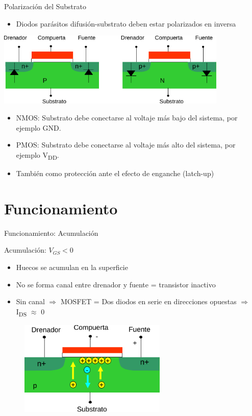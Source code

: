 \documentclass[t,aspectratio=169,10pt]{beamer}
\begin{document}
\begin{frame}{Polarización del Substrato}
\begin{itemize}
	\item Diodos parásitos difusión-substrato deben estar polarizados en inversa
\end{itemize}

\vspace{3mm}
\centering
\includegraphics[width=11cm]{polsub}

\vspace{3mm}
\begin{itemize}
	\item NMOS: Substrato debe conectarse al voltaje más bajo del sistema, por ejemplo GND.
	\item PMOS: Substrato debe conectarse al voltaje más alto del sistema, por ejemplo V\textsubscript{DD}.
	\item También como protección ante el efecto de enganche (latch-up)
\end{itemize}
\end{frame}



\section{Funcionamiento}
\begin{frame}{Funcionamiento: Acumulación}

Acumulación: \hspace{5mm} $V_{GS} < 0$

\begin{itemize}
    \item Huecos se acumulan en la superficie
    \item No se forma canal entre drenador y fuente = transistor inactivo
    \item Sin canal $\Rightarrow$ MOSFET = Dos diodos en serie en direcciones opuestas $\Rightarrow$ I\textsubscript{DS} $\approx$ 0
\end{itemize}

\begin{figure}[H]
    \centering
    \includegraphics[width=7cm]{acumula1}
\end{figure}
 
 \end{frame}
\end{document}
